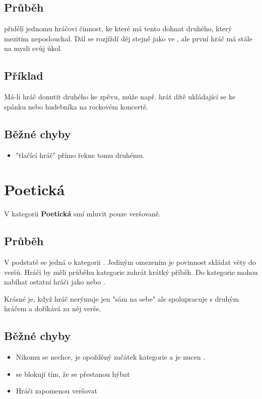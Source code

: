 \subsection{Průběh}  přidělí jednomu hráčovi činnost, ke které  má tento dohnat druhého, který mezitím neposlouchal. Dál se rozjíždí děj stejně jako ve , ale první hráč má stále na mysli svůj úkol.  
 
\subsection{Příklad} Má-li hráč donutit druhého ke zpěvu, může např. hrát dítě ukládající se ke spánku nebo hudebníka na rockovém koncertě. 
  
\subsection{ Běžné chyby } \begin{itemize}
\item  "tlačící hráč"{} přímo řekne tomu druhému.
\end{itemize}
 
 
 
 
 
 
 
 
\needspace{5cm} \section{Poetická} \label{poetická}  
 
V kategorii \textbf{Poetická}{} smí  mluvit pouze veršovaně. 
 
\subsection{ Průběh } V podstatě se jedná o kategorii . Jediným omezením  je povinnost skládat věty do veršů. Hráči by měli průběhu kategorie zahrát krátký příběh. 
Do kategorie mohou nabíhat ostatní hráči jako  nebo . 
 
Krásné je, když hráč nerýmuje jen "sám na sebe"{} ale spolupracuje s druhým hráčem a doříkává za něj verše. 
 
\subsection{ Běžné chyby } \begin{itemize}
\item Nikomu se nechce, je opožděný začátek kategorie a  je nucen  .
\item {} se blokují tím, že se přestanou hýbat
\item Hráči zapomenou veršovat
\end{itemize}
 
